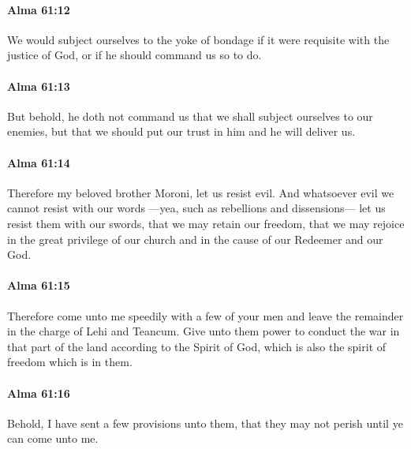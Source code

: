 		\paragraph{Alma 61:12} %
			\label{ALMA-61-12}

			We would subject ourselves to the yoke of bondage
			if it were requisite with the justice of God,
			or if he should command us so to do.

		\paragraph{Alma 61:13} %
			\label{ALMA-61-13}

			But behold, he doth not command us
			that we shall subject ourselves to our enemies,
			but that we should put our trust in him and he will deliver us.

		\paragraph{Alma 61:14} %
			\label{ALMA-61-14}

			Therefore my beloved brother Moroni, let us resist evil.
			And whatsoever evil we cannot resist with our words
			---yea, such as rebellions and dissensions---
			let us resist them with our swords,
			that we may retain our freedom,
			that we may rejoice in the great privilege of our church
			and in the cause of our Redeemer and our God.

		\paragraph{Alma 61:15} %
			\label{ALMA-61-15}

			Therefore come unto me speedily with a few of your men
			and leave the remainder in the charge of Lehi and Teancum.
			Give unto them power to conduct the war in that part of the land
			according to the Spirit of God,
			which is also the spirit of freedom which is in them.

		\paragraph{Alma 61:16} %
			\label{ALMA-61-16}

			Behold, I have sent a few provisions unto them,
			that they may not perish until ye can come unto me.

